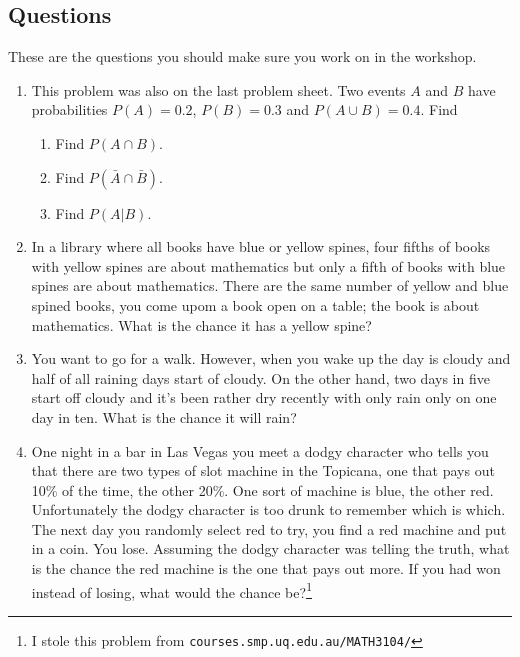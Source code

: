 \documentclass[11pt,a4paper]{scrartcl}
\begin{document}
\subsection*{Questions}

These are the questions you should make sure you work on in the workshop.

\begin{enumerate}

\item This problem was also on the last problem sheet. Two events $A$ and $B$ have probabilities $P(A)=0.2$, $P(B)=0.3$ and $P(A\cup B)=0.4$. Find
\begin{enumerate}
\item Find $P(A\cap B)$.
\item Find $P(\bar{A}\cap \bar{B})$.
\item Find $P(A|B)$.
\end{enumerate}

\item In a library where all books have blue or yellow spines, four
  fifths of books with yellow spines are about mathematics but only a
  fifth of books with blue spines are about mathematics. There are the
  same number of yellow and blue spined books, you come upom a book
  open on a table; the book is about mathematics. What is the chance
  it has a yellow spine?

\item You want to go for a walk. However, when you wake up the day is
  cloudy and half of all raining days start of cloudy. On the other
  hand, two days in five start off cloudy and it's been rather dry
  recently with only rain only on one day in ten. What is the chance
  it will rain?
  
\item One night in a bar in Las Vegas you meet a dodgy character who
  tells you that there are two types of slot machine in the Topicana,
  one that pays out 10\% of the time, the other 20\%. One sort of
  machine is blue, the other red. Unfortunately the dodgy character is
  too drunk to remember which is which. The next day you randomly
  select red to try, you find a red machine and put in a coin. You
  lose. Assuming the dodgy character was telling the truth, what is
  the chance the red machine is the one that pays out more. If you had
  won instead of losing, what would the chance be?\footnote{I stole
    this problem from \texttt{courses.smp.uq.edu.au/MATH3104/}}

\end{enumerate}
  
\end{document}
